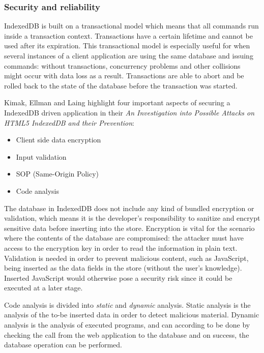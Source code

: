\subsubsection{Security and reliability}
\label{subsec:security}
IndexedDB is built on a transactional model which means that all commands run inside a transaction context. Transactions have a certain lifetime and cannot be used after its expiration. This transactional model is especially useful for when several instances of a client application are using the same database and issuing commands: without transactions, concurrency problems and other collisions might occur with data loss as a result. Transactions are able to abort and be rolled back to the state of the database before the transaction was started.

Kimak, Ellman and Laing highlight four important aspects of securing a IndexedDB driven application in their \emph{An Investigation into Possible Attacks on HTML5 IndexedDB and their Prevention}\cite{IndexedDBSecurity:2012:Online}:

\begin{itemize}
  \item Client side data encryption
  \item Input validation
  \item SOP (Same-Origin Policy)
  \item Code analysis
\end{itemize}

The database in IndexedDB does not include any kind of bundled encryption or validation, which means it is the developer's responsibility to sanitize and encrypt sensitive data before inserting into the store. Encryption is vital for the scenario where the contents of the database are compromised: the attacker must have access to the encryption key in order to read the information in plain text. Validation is needed in order to prevent malicious content, such as JavaScript, being inserted as the data fields in the store (without the user's knowledge). Inserted JavaScript would otherwise pose a security risk since it could be executed at a later stage.

Code analysis is divided into \emph{static} and \emph{dynamic} analysis. Static analysis is the analysis of the to-be inserted data in order to detect malicious material. Dynamic analysis is the analysis of executed programs, and can according to \cite{IndexedDBSecurity:2012:Online} be done by checking the call from the web application to the database and on success, the database operation can be performed.

